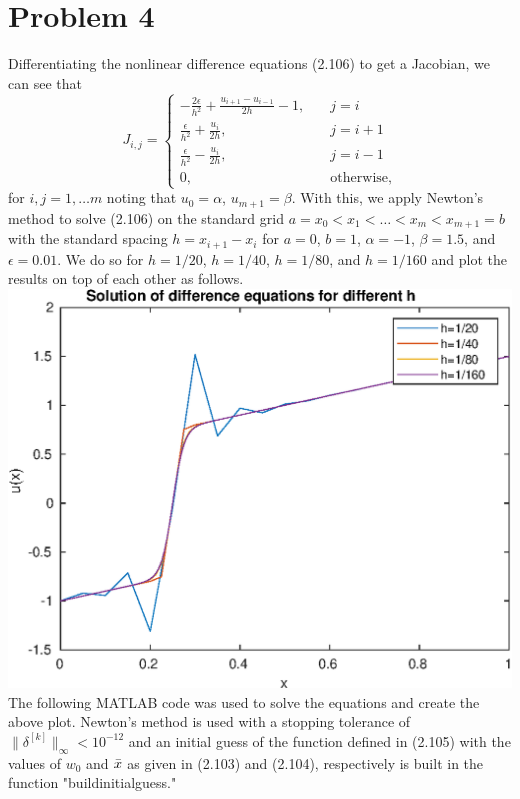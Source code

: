 \documentclass{article}
\begin{document}
\section{Problem 4}
Differentiating the nonlinear difference equations (2.106) to get a Jacobian, we can see that 
\[
J_{i,j}=\begin{cases}
-\frac{2\epsilon}{h^2}+\frac{u_{i+1}-u_{i-1}}{2h}-1, \quad &j=i\\
\frac{\epsilon}{h^2}+\frac{u_i}{2h}, \quad &j=i+1\\
\frac{\epsilon}{h^2}-\frac{u_i}{2h}, \quad &j=i-1\\
0, \quad &\text{otherwise},
\end{cases}
\]
for $i,j=1,\ldots m$ noting that $u_0=\alpha$, $u_{m+1}=\beta$. With this, we apply Newton's method to solve (2.106) on the standard grid $a=x_0<x_1<\ldots<x_m<x_{m+1}=b$ with the standard spacing $h=x_{i+1}-x_i$ for $a=0$, $b=1$, $\alpha = -1$, $\beta = 1.5$, and $\epsilon = 0.01$. We do so for $h=1/20$, $h=1/40$, $h=1/80$, and $h=1/160$ and plot the results on top of each other as follows.\\
\includegraphics[scale=0.8]{hw3p4.eps}\\
The following MATLAB code was used to solve the equations and create the above plot. Newton's method is used with a stopping tolerance of $\|\delta^{[k]}\|_\infty<10^{-12}$ and an initial guess of the function defined in (2.105) with the values of $w_0$ and $\Bar{x}$ as given in (2.103) and (2.104), respectively is built in the function "buildinitialguess."
\end{document}
